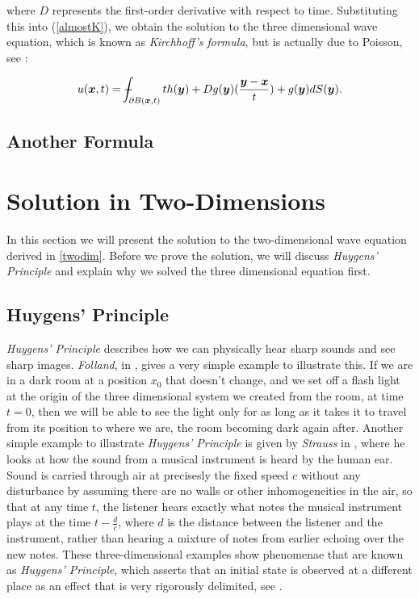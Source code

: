 \documentclass[a4paper, 12pt]{article}
\def\Xint#1{\mathchoice
{\XXint\displaystyle\textstyle{#1}}%
{\XXint\textstyle\scriptstyle{#1}}%
{\XXint\scriptstyle\scriptscriptstyle{#1}}%
{\XXint\scriptscriptstyle\scriptscriptstyle{#1}}%
\!\int}
\def\XXint#1#2#3{{\setbox0=\hbox{$#1{#2#3}{\int}$ }
\vcenter{\hbox{$#2#3$ }}\kern-.6\wd0}}
\def\dashint{\Xint-}
\numberwithin{equation}{section}
\begin{document}
where $D$ represents the first-order derivative with respect to time. Substituting this into (\ref{almostK}), we obtain the solution to the three dimensional wave equation, which is known as \emph{Kirchhoff's formula}, but is 
actually due to Poisson, see \cite{Str}:

\begin{equation*}
    u(\boldsymbol{x},t)=\dashint_{\partial B(\boldsymbol{x},t)}{th(\boldsymbol{y})+Dg(\boldsymbol{y})(\frac{\boldsymbol{y}-\boldsymbol{x}}{t})+g(\boldsymbol{y})dS(\boldsymbol{y})}.
\end{equation*}

\subsection{Another Formula}


\section{Solution in Two-Dimensions}
In this section we will present the solution to the two-dimensional wave equation derived in \ref{twodim}. Before we prove the solution, we will discuss \emph{Huygens' 
Principle} and explain why we solved the three dimensional equation first.

\subsection{Huygens' Principle}
\emph{Huygens' Principle} describes how we can physically hear sharp sounds and see sharp images. \emph{Folland}, in \cite{Fol}, gives a very simple example to illustrate 
this. If we are in a dark room at a position $x_0$ that doesn't change, and we set off a flash light at the origin of the three dimensional system we 
created from the room, at time $t=0$, then we will be able to see the light only for as long as it takes it to travel from its position to where we are, the room
becoming dark again after. Another simple example to illustrate \emph{Huygens' Principle} is given by \emph{Strauss} in \cite{Str}, where he looks at how the sound
from a musical instrument is heard by the human ear. Sound is carried through air at precisesly the fixed speed $c$ without any disturbance by assuming
there are no walls or other inhomogeneities in the air, so that at any time $t$, the listener hears exactly what notes the musical instrument plays at the time $t-\frac{d}{c}$,
where $d$ is the distance between the listener and the instrument, rather than hearing a mixture of notes from earlier echoing over the new notes. These three-dimensional 
examples show phenomenae that are known as \emph{Huygens' Principle}, which asserts that an initial state is observed at a different place as an effect that is 
very rigorously delimited, see \cite{Hil} .
\\
\end{document}
